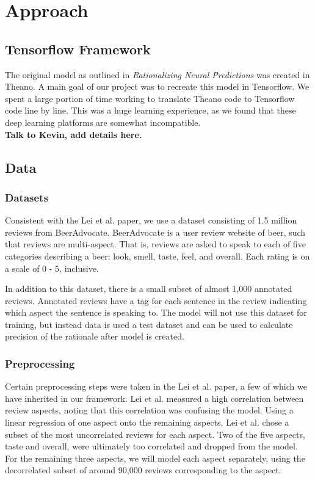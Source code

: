 \documentclass{article} %
\begin{document}
\section{Approach}

\subsection{Tensorflow Framework}

The original model as outlined in \textit{Rationalizing Neural Predictions} was
created in Theano. A main goal of our project was to recreate this model in
Tensorflow. We spent a large portion of time working to translate Theano code to
Tensorflow code line by line. This was a huge learning experience, as we found
that these deep learning platforms are somewhat incompatible. \\

\textbf{Talk to Kevin, add details here.}

\subsection{Data}

\subsubsection{Datasets}

Consistent with the Lei et al. paper, we use a dataset consisting of 1.5 million
reviews from BeerAdvocate. BeerAdvocate is a user review website of beer, such
that reviews are multi-aspect. That is, reviews are asked to speak to each of
five categories describing a beer: look, smell, taste, feel, and overall. Each
rating is on a scale of 0 - 5, inclusive.

In addition to this dataset, there is a small subset of almost 1,000 annotated
reviews. Annotated reviews have a tag for each sentence in the review indicating
which aspect the sentence is speaking to. The model will not use this dataset
for training, but instead data is used a test dataset and can be used to
calculate precision of the rationale after model is created.

\subsubsection{Preprocessing}

Certain preprocessing steps were taken in the Lei et al. paper, a few of which
we have inherited in our framework. Lei et al. measured a high correlation
between review aspects, noting that this correlation was confusing the model.
Using a linear regression of one aspect onto the remaining aspects, Lei et al.
chose a subset of the most uncorrelated reviews for each aspect. Two of the five
aspects, taste and overall, were ultimately too correlated and dropped from the
model. For the remaining three aspects, we will model each aspect separately,
using the decorrelated subset of around 90,000 reviews corresponding to the
aspect.
\end{document}
